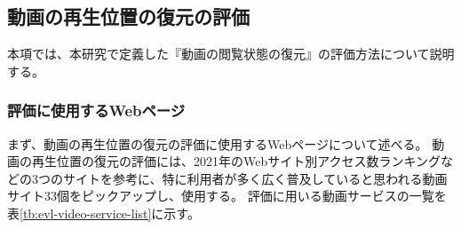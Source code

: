 \subsection{動画の再生位置の復元の評価}
本項では、本研究で定義した『動画の閲覧状態の復元』の評価方法について説明する。

\subsubsection{評価に使用するWebページ}
まず、動画の再生位置の復元の評価に使用するWebページについて述べる。
動画の再生位置の復元の評価には、2021年のWebサイト別アクセス数ランキング\cite{The-50-Most-Visited-Websites-in-the-World}などの3つのサイト\cite{mmd-video-research}\cite{popular-video-service}を参考に、特に利用者が多く広く普及していると思われる動画サイト33個をピックアップし、使用する。
評価に用いる動画サービスの一覧を表\ref{tb:evl-video-service-list}に示す。

